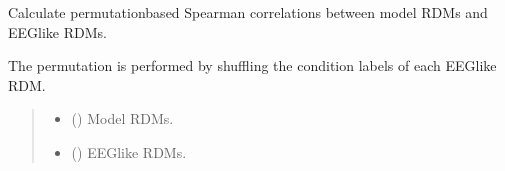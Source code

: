 \documentclass[letterpaper,10pt,english]{sphinxhowto}
\begin{document}
\begin{fulllineitems}
\label{\detokenize{corr_cal_by_rdm:neurora.corr_cal_by_rdm.rdms_corr_perm}}
\pysigstartsignatures
{}
\pysigstopsignatures
\sphinxAtStartPar
Calculate permutation\sphinxhyphen{}based Spearman correlations between model RDMs
and EEG\sphinxhyphen{}like RDMs.

\sphinxAtStartPar
The permutation is performed by shuffling the condition labels of each
EEG\sphinxhyphen{}like RDM.
\begin{quote}\begin{description}
\begin{itemize}
\item {} 
\sphinxAtStartPar
{} (\sphinxstyleliteralemphasis{\sphinxupquote{, }}\sphinxstyleliteralemphasis{\sphinxupquote{ {[}}}\sphinxstyleliteralemphasis{\sphinxupquote{, }}\sphinxstyleliteralemphasis{\sphinxupquote{, }}\sphinxstyleliteralemphasis{\sphinxupquote{{]}}}) \textendash{} Model RDMs.

\item {} 
\sphinxAtStartPar
{} (\sphinxstyleliteralemphasis{\sphinxupquote{, }}\sphinxstyleliteralemphasis{\sphinxupquote{ {[}}}\sphinxstyleliteralemphasis{\sphinxupquote{, }}\sphinxstyleliteralemphasis{\sphinxupquote{, }}\sphinxstyleliteralemphasis{\sphinxupquote{{]}}}) \textendash{} EEG\sphinxhyphen{}like RDMs.


\end{itemize}
\end{description}
\end{quote}
\end{fulllineitems}
\end{document}
